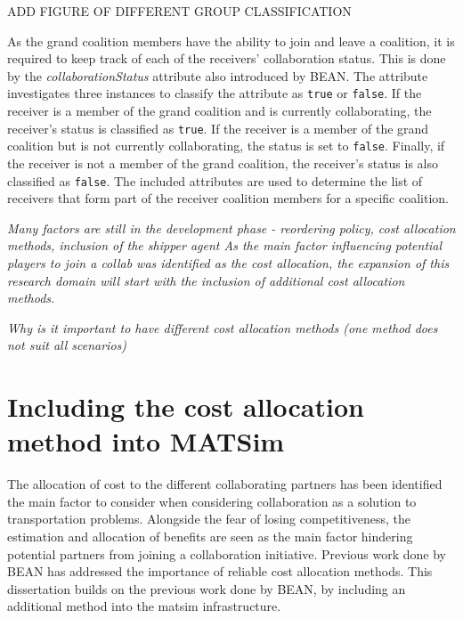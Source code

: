 ADD FIGURE OF DIFFERENT GROUP CLASSIFICATION

As the grand coalition members have the ability to join and leave a coalition, it is required to keep track of each of the receivers' collaboration status. This is done by the \textit{collaborationStatus} attribute also introduced by BEAN. The attribute investigates three instances to classify the attribute as \texttt{true} or \texttt{false}. If the receiver is a member of the grand coalition and is currently collaborating, the receiver's status is classified as \texttt{true}. If the receiver is a member of the grand coalition but is not currently collaborating, the status is set to \texttt{false}. Finally, if the receiver is not a member of the grand coalition, the receiver's status is also classified as \texttt{false}.
The included attributes are used to determine the list of receivers that form part of the receiver coalition members for a specific coalition. 




\textit{Many factors are still in the development phase - reordering policy, cost allocation methods, inclusion of the shipper agent
As the main factor influencing potential players to join a collab was identified as the cost allocation, the expansion of this research domain will start with the inclusion of additional cost allocation methods.}



\textit{Why is it important to have different cost allocation methods (one method does not suit all scenarios)}


\section{Including the cost allocation method into MATSim}

The allocation of cost to the different collaborating partners has been identified the main factor to consider when considering collaboration as a solution to transportation problems. Alongside the fear of losing competitiveness, the estimation and allocation of benefits are seen as the main factor hindering potential partners from joining a collaboration initiative. Previous work done by BEAN has addressed the importance of reliable cost allocation methods. This dissertation builds on the previous work done by BEAN, by including an additional method into the \acrshort{matsim} infrastructure.


